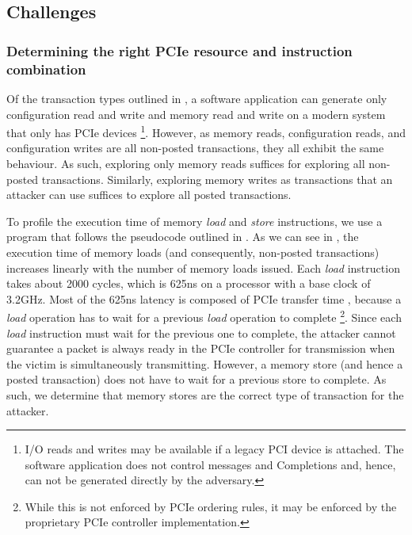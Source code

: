 \subsection{Challenges}
\label{subsec:interconnect-sc-store-ops-challenges}


\subsubsection{Determining the right PCIe resource and instruction combination}

Of the transaction types outlined in , a software application can generate only configuration read and write and memory read and write on a modern system that only has PCIe devices
\footnote{I/O reads and writes may be available if a legacy PCI device is attached.
The software application does not control messages and Completions and, hence, can not be generated directly by the adversary.}.
However, as memory reads, configuration reads, and configuration writes are all non-posted transactions, they all exhibit the same behaviour.
As such, exploring only memory reads suffices for exploring all non-posted transactions.
Similarly, exploring memory writes as transactions that an attacker can use suffices to explore all posted transactions. 


To profile the execution time of memory \textit{load} and \textit{store} instructions, we use a program that follows the pseudocode outlined in .
As we can see in , the execution time of memory loads (and consequently, non-posted transactions) increases linearly with the number of memory loads issued.
Each \textit{load} instruction takes about 2000 cycles, which is 625ns on a processor with a base clock of 3.2GHz.
Most of the 625ns latency is composed of PCIe transfer time \cite{neugebauer2018understanding}, because a \textit{load} operation has to wait for a previous \textit{load} operation to complete 
\footnote{While this is not enforced by PCIe ordering rules, it may be enforced by the proprietary PCIe controller implementation.}.
Since each \textit{load} instruction must wait for the previous one to complete, the attacker cannot guarantee a packet is always ready in the PCIe controller for transmission when the victim is simultaneously transmitting.
However, a memory store (and hence a posted transaction) does not have to wait for a previous store to complete.
As such, we determine that memory stores are the correct type of transaction for the attacker.

